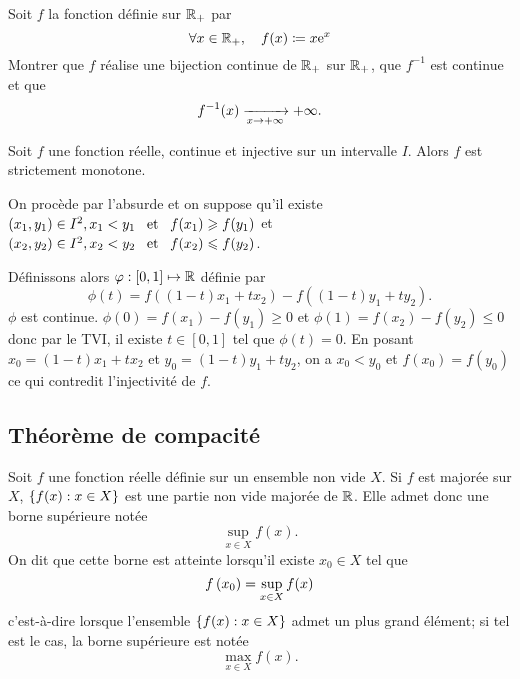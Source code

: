 \documentclass{magnolia}
\begin{document}
\begin{exoUnique}
\exo Soit $f$ la fonction définie sur $\mathbb{R}_+$ par
  \[\forall x\in\mathbb{R}_+ ,\quad f(x)\coloneqq x {\rm e}^x\]
  Montrer que $f$ réalise une bijection continue de $\mathbb{R}_+$ sur $\mathbb{R}_+$, que
  $f^{-1}$ est continue et que \[f^{-1}(x)\xrightarrow[x\rightarrow +\infty]{}+\infty.\]
\end{exoUnique}

\begin{proposition}
Soit $f$ une fonction réelle, continue et injective sur un intervalle $I$. Alors $f$ est strictement monotone.
\end{proposition}

\begin{preuve}
On procède par l'absurde et on suppose qu'il existe $(x_1,y_1) \in I^2, x_1<y_1 \quad\!\text{et}\quad\! f(x_1)\geqslant f(y_1)$ et $(x_2,y_2) \in I^2, x_2<y_2 \quad\!\text{et}\quad\! f(x_2)\leqslant f(y_2)$.

Définissons alors $\varphi : \left[0,1\right]
\mapsto \mathbb{R}$ définie par $$\phi(t)=f((1-t)x_1+tx_2)-f((1-t)y_1+ty_2).$$
$\phi$ est continue. $\phi(0)=f(x_1)-f(y_1)\geq 0$ et $\phi(1)=f(x_2)-f(y_2)\leq 0$ donc par le TVI, il existe $t\in [0,1]$ tel que $\phi(t)=0$. En posant $x_0=(1-t)x_1+tx_2$ et $y_0=(1-t)y_1+ty_2$, on a $x_0<y_0$ et $f(x_0)=f(y_0)$ ce qui contredit l'injectivité de $f$.
\end{preuve}

\subsection{Théorème de compacité}

\begin{definition}[utile=-3]
Soit $f$ une fonction réelle définie sur un ensemble non vide $X$. Si $f$ est
majorée sur $X$, $\left\{f(x) : x\in X\right\}$ est une partie non vide majorée de
$\mathbb{R}$. Elle admet donc une borne supérieure notée
\[\sup_{x\in X} f(x).\]
On dit que cette borne est atteinte lorsqu'il existe $x_0\in X$ tel que
\[f\left(x_0\right)=\sup_{x\in X} f(x)\]
c'est-à-dire lorsque l'ensemble $\left\{f(x) : x\in X\right\}$ admet un plus grand
élément; si tel est le cas, la borne supérieure est notée
\[\max_{x\in X} f(x).\]
\end{definition}
\end{document}
